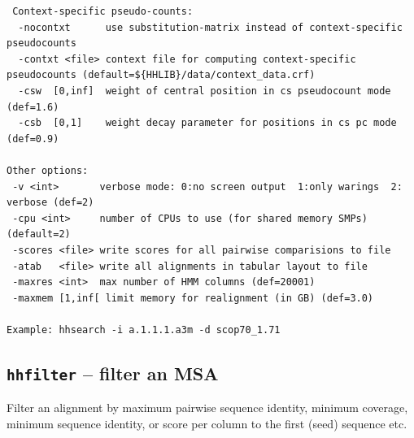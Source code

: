 \documentclass[11pt,a4paper]{article}
\begin{document}
\begin{verbatim}
 Context-specific pseudo-counts:                                                  
  -nocontxt      use substitution-matrix instead of context-specific pseudocounts 
  -contxt <file> context file for computing context-specific pseudocounts (default=${HHLIB}/data/context_data.crf)
  -csw  [0,inf]  weight of central position in cs pseudocount mode (def=1.6)
  -csb  [0,1]    weight decay parameter for positions in cs pc mode (def=0.9)

Other options:                                                                   
 -v <int>       verbose mode: 0:no screen output  1:only warings  2: verbose (def=2)
 -cpu <int>     number of CPUs to use (for shared memory SMPs) (default=2)      
 -scores <file> write scores for all pairwise comparisions to file               
 -atab   <file> write all alignments in tabular layout to file                   
 -maxres <int>  max number of HMM columns (def=20001)             
 -maxmem [1,inf[ limit memory for realignment (in GB) (def=3.0)          

Example: hhsearch -i a.1.1.1.a3m -d scop70_1.71
\end{verbatim} 
\normalsize


\subsection{{\tt hhfilter} -- filter an MSA}

Filter an alignment by maximum pairwise sequence identity, minimum coverage,
minimum sequence identity, or score per column to the first (seed) sequence etc.
\end{document}
